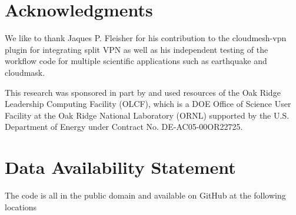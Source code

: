 \documentclass[utf8]{FrontiersinVancouver} %
\begin{document}
\section*{Acknowledgments}

We like to thank Jaques P. Fleisher for his contribution to the cloudmesh-vpn plugin for integrating split VPN as well as his independent testing of the workflow code for multiple scientific applications such as earthquake and cloudmask.

This research was sponsored in part by and used resources of the Oak Ridge Leadership Computing Facility (OLCF), which is a DOE Office of Science User Facility at the Oak Ridge National Laboratory (ORNL) supported by the U.S. Department of Energy under Contract No. DE-AC05-00OR22725.

\section*{Data Availability Statement}

The code is all in the public domain and available on GitHub at the following locations
\end{document}
